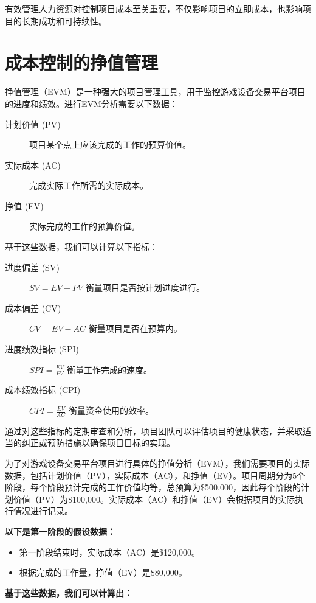 \documentclass{ctexart}
\begin{document}
有效管理人力资源对控制项目成本至关重要，不仅影响项目的立即成本，也影响项目的长期成功和可持续性。

\section{成本控制的挣值管理}

挣值管理（EVM）是一种强大的项目管理工具，用于监控游戏设备交易平台项目的进度和绩效。进行EVM分析需要以下数据：

\begin{description}
    \item[计划价值 (PV)] 项目某个点上应该完成的工作的预算价值。
    \item[实际成本 (AC)] 完成实际工作所需的实际成本。
    \item[挣值 (EV)] 实际完成的工作的预算价值。
\end{description}

基于这些数据，我们可以计算以下指标：

\begin{description}
    \item[进度偏差 (SV)] \( SV = EV - PV \) 衡量项目是否按计划进度进行。
    \item[成本偏差 (CV)] \( CV = EV - AC \) 衡量项目是否在预算内。
    \item[进度绩效指标 (SPI)] \( SPI = \frac{EV}{PV} \) 衡量工作完成的速度。
    \item[成本绩效指标 (CPI)] \( CPI = \frac{EV}{AC} \) 衡量资金使用的效率。
\end{description}

通过对这些指标的定期审查和分析，项目团队可以评估项目的健康状态，并采取适当的纠正或预防措施以确保项目目标的实现。

为了对游戏设备交易平台项目进行具体的挣值分析（EVM），我们需要项目的实际数据，包括计划价值（PV），实际成本（AC），和挣值（EV）。项目周期分为5个阶段，每个阶段预计完成的工作价值均等，总预算为\$500,000，因此每个阶段的计划价值（PV）为\$100,000。实际成本（AC）和挣值（EV）会根据项目的实际执行情况进行记录。

\textbf{以下是第一阶段的假设数据：}

\begin{itemize}
    \item 第一阶段结束时，实际成本（AC）是\$120,000。
    \item 根据完成的工作量，挣值（EV）是\$80,000。
\end{itemize}

\textbf{基于这些数据，我们可以计算出：}
\end{document}
